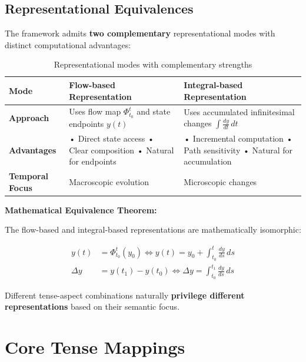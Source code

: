\documentclass[11pt]{article}
\theoremstyle{defstyle}
\theoremstyle{mapstyle}
\newenvironment{theorembox}
{\begin{tcolorbox}[
  enhanced,
  enforce breakable,
  colback=defbox,
  colframe=theoremgreen!60,
  boxrule=1pt,
  arc=4pt,
  left=8pt,right=8pt,top=8pt,bottom=8pt,
  before skip=10pt,after skip=10pt
]}
{\end{tcolorbox}}
\begin{document}
\subsection{Representational Equivalences}

The framework admits \textbf{two complementary} representational modes with distinct computational advantages:

\begin{table}[h]
\centering
\begin{tabular}{>{\bfseries}p{}>{\raggedright\arraybackslash}p{}>{\raggedright\arraybackslash}p{}}
\toprule
\textbf{Mode} & \textbf{Flow-based Representation} & \textbf{Integral-based Representation} \\
\midrule
Approach & Uses flow map $\Phi_{t_0}^t$ and state endpoints $y(t)$ & Uses accumulated infinitesimal changes $\displaystyle\int \frac{dy}{dt}\,dt$ \\
\addlinespace
Advantages & • Direct state access • Clear composition • Natural for endpoints & • Incremental computation • Path sensitivity • Natural for accumulation \\
\addlinespace
Temporal Focus & Macroscopic evolution & Microscopic changes \\
\bottomrule
\end{tabular}
\caption{Representational modes with complementary strengths}
\end{table}

\begin{theorembox}
\textbf{Mathematical Equivalence Theorem:}

The flow-based and integral-based representations are mathematically isomorphic:

\begin{align}
y(t) &= \Phi_{t_0}^t(y_0) \iff y(t) = y_0 + \int_{t_0}^t \frac{dy}{ds}\,ds \label{eq:equiv1}\\[8pt]
\Delta y &= y(t_1) - y(t_0) \iff \Delta y = \int_{t_0}^{t_1} \frac{dy}{ds}\,ds \label{eq:equiv2}
\end{align}

Different tense-aspect combinations naturally \textbf{privilege different representations} based on their semantic focus.
\end{theorembox}

\vspace{1.5\baselineskip}

\section{Core Tense Mappings}
\end{document}

